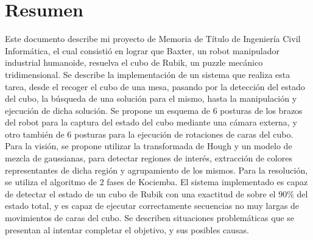 

\chapter*{Resumen}
\label{cha:abstract}

Este documento describe mi proyecto de Memoria de Título de Ingeniería Civil Informática, el cual consistió en lograr que Baxter, un robot manipulador industrial humanoide, resuelva el cubo de Rubik, un puzzle mecánico tridimensional. Se describe la implementación de un sistema que realiza esta tarea, desde el recoger el cubo de una mesa, pasando por la detección del estado del cubo, la búsqueda de una solución para el mismo, hasta la manipulación y ejecución de dicha solución. Se propone un esquema de 6 posturas de los brazos del robot para la captura del estado del cubo mediante una cámara externa, y otro también de 6 posturas para la ejecución de rotaciones de caras del cubo. Para la visión, se propone utilizar la transformada de Hough y un modelo de mezcla de gaussianas, para detectar regiones de interés, extracción de colores representantes de dicha región y agrupamiento de los mismos. Para la resolución, se utiliza el algoritmo de $2$ fases de Kociemba. El sistema implementado es capaz de detectar el estado de un cubo de Rubik con una exactitud de sobre el $90$\% del estado total, y es capaz de ejecutar correctamente secuencias no muy largas de movimientos de caras del cubo. Se describen situaciones problemáticas que se presentan al intentar completar el objetivo, y sus posibles causas.

